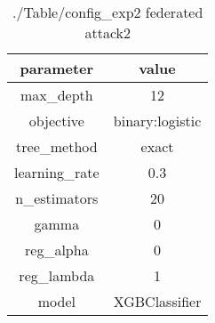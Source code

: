 \begin{table}[h]
\centering
\begin{tabular}{|c|c|}
\hline
parameter & value\\
\hline
max_depth & 12 \\\hline
objective & binary:logistic \\\hline
tree_method & exact \\\hline
learning_rate & 0.3 \\\hline
n_estimators & 20 \\\hline
gamma & 0 \\\hline
reg_alpha & 0 \\\hline
reg_lambda & 1 \\\hline
model & XGBClassifier \\\hline

\end{tabular}\caption{./Table/config_exp2 federated attack2}
\label{tab:./Table/config_exp2 federated attack2}
\end{table}
